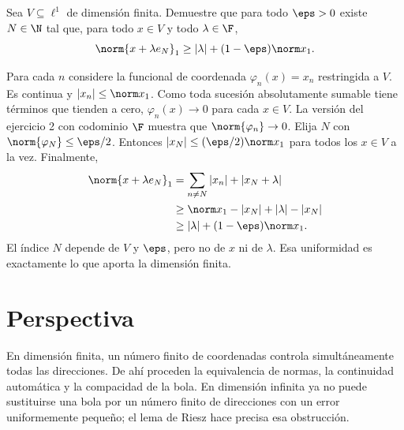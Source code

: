 \begin{ejercicio}
Sea $V\subseteq\ell^1$ de dimensión finita. Demuestre que para todo $\eps>0$ existe $N\in\N$ tal que, para todo $x\in V$ y todo $\lambda\in\F$,
\[
 \norm{x+\lambda e_N}_1\geq|\lambda|+(1-\eps)\norm x_1.
\]
\end{ejercicio}
\begin{solucion}
Para cada $n$ considere la funcional de coordenada $\varphi_n(x)=x_n$ restringida a $V$. Es continua y $|x_n|\leq\norm x_1$. Como toda sucesión absolutamente sumable tiene términos que tienden a cero, $\varphi_n(x)\to0$ para cada $x\in V$. La versión del ejercicio 2 con codominio $\F$ muestra que $\norm{\varphi_n}\to0$. Elija $N$ con $\norm{\varphi_N}\leq\eps/2$. Entonces $|x_N|\leq(\eps/2)\norm x_1$ para todos los $x\in V$ a la vez. Finalmente,
\begin{align*}
 \norm{x+\lambda e_N}_1
 &=\sum_{n\ne N}|x_n|+|x_N+\lambda|\\
 &\geq\norm x_1-|x_N|+|\lambda|-|x_N|\\
 &\geq|\lambda|+(1-\eps)\norm x_1.
\end{align*}
El índice $N$ depende de $V$ y $\eps$, pero no de $x$ ni de $\lambda$. Esa uniformidad es exactamente lo que aporta la dimensión finita.
\end{solucion}

\section{Perspectiva}
En dimensión finita, un número finito de coordenadas controla simultáneamente todas las direcciones. De ahí proceden la equivalencia de normas, la continuidad automática y la compacidad de la bola. En dimensión infinita ya no puede sustituirse una bola por un número finito de direcciones con un error uniformemente pequeño; el lema de Riesz hace precisa esa obstrucción.
